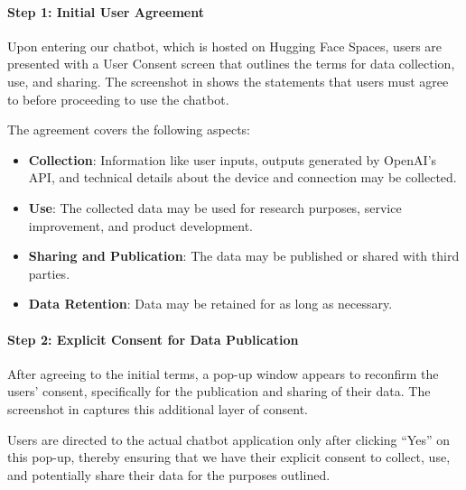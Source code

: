 \documentclass{article} %
\begin{document}
\paragraph{Step 1: Initial User Agreement}

Upon entering our chatbot, which is hosted on Hugging Face Spaces, users are presented with a User Consent screen that outlines the terms for data collection, use, and sharing. The screenshot in  shows the statements that users must agree to before proceeding to use the chatbot.



The agreement covers the following aspects:

\begin{itemize}
    \item \textbf{Collection}: Information like user inputs, outputs generated by OpenAI's API, and technical details about the device and connection may be collected.
    \item \textbf{Use}: The collected data may be used for research purposes, service improvement, and product development.
    \item \textbf{Sharing and Publication}: The data may be published or shared with third parties.
    \item \textbf{Data Retention}: Data may be retained for as long as necessary.
\end{itemize}

\paragraph{Step 2: Explicit Consent for Data Publication}

After agreeing to the initial terms, a pop-up window appears to reconfirm the users' consent, specifically for the publication and sharing of their data. The screenshot in  captures this additional layer of consent.

Users are directed to the actual chatbot application only after clicking ``Yes'' on this pop-up, thereby ensuring that we have their explicit consent to collect, use, and potentially share their data for the purposes outlined.
\end{document}
